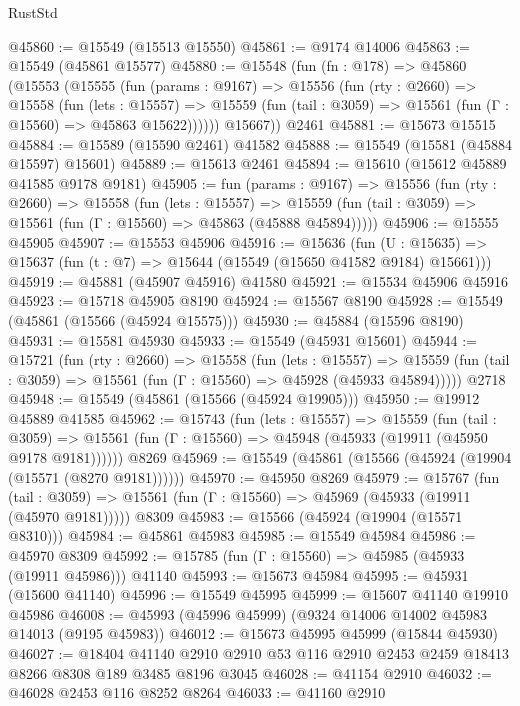 \begin{lexlean}{RustStd}
\begin{coremodule}
@45860 := @15549 (@15513 @15550)
@45861 := @9174 @14006
@45863 := @15549 (@45861 @15577)
@45880 := @15548
    (fun (fn : @178) =>
    @45860
      (@15553
        (@15555
          (fun (params : @9167) =>
          @15556
            (fun (rty : @2660) =>
            @15558
              (fun (lets : @15557) =>
              @15559 (fun (tail : @3059) => @15561 (fun (Γ : @15560) => @45863 @15622))))))
        @15667))
    @2461
@45881 := @15673 @15515
@45884 := @15589 (@15590 @2461) @41582
@45888 := @15549 (@15581 (@45884 @15597) @15601)
@45889 := @15613 @2461
@45894 := @15610 (@15612 @45889 @41585 @9178 @9181)
@45905 := fun (params : @9167) =>
  @15556
    (fun (rty : @2660) =>
    @15558
      (fun (lets : @15557) =>
      @15559 (fun (tail : @3059) => @15561 (fun (Γ : @15560) => @45863 (@45888 @45894)))))
@45906 := @15555 @45905
@45907 := @15553 @45906
@45916 := @15636
    (fun (U : @15635) => @15637 (fun (t : @7) => @15644 (@15549 (@15650 @41582 @9184) @15661)))
@45919 := @45881 (@45907 @45916) @41580
@45921 := @15534 @45906 @45916
@45923 := @15718 @45905 @8190
@45924 := @15567 @8190
@45928 := @15549 (@45861 (@15566 (@45924 @15575)))
@45930 := @45884 (@15596 @8190)
@45931 := @15581 @45930
@45933 := @15549 (@45931 @15601)
@45944 := @15721
    (fun (rty : @2660) =>
    @15558
      (fun (lets : @15557) =>
      @15559 (fun (tail : @3059) => @15561 (fun (Γ : @15560) => @45928 (@45933 @45894)))))
    @2718
@45948 := @15549 (@45861 (@15566 (@45924 @19905)))
@45950 := @19912 @45889 @41585
@45962 := @15743
    (fun (lets : @15557) =>
    @15559
      (fun (tail : @3059) =>
      @15561 (fun (Γ : @15560) => @45948 (@45933 (@19911 (@45950 @9178 @9181))))))
    @8269
@45969 := @15549 (@45861 (@15566 (@45924 (@19904 (@15571 (@8270 @9181))))))
@45970 := @45950 @8269
@45979 := @15767
    (fun (tail : @3059) => @15561 (fun (Γ : @15560) => @45969 (@45933 (@19911 (@45970 @9181)))))
    @8309
@45983 := @15566 (@45924 (@19904 (@15571 @8310)))
@45984 := @45861 @45983
@45985 := @15549 @45984
@45986 := @45970 @8309
@45992 := @15785 (fun (Γ : @15560) => @45985 (@45933 (@19911 @45986))) @41140
@45993 := @15673 @45984
@45995 := @45931 (@15600 @41140)
@45996 := @15549 @45995
@45999 := @15607 @41140 @19910 @45986
@46008 := @45993 (@45996 @45999) (@9324 @14006 @14002 @45983 @14013 (@9195 @45983))
@46012 := @15673 @45995 @45999 (@15844 @45930)
@46027 := @18404
    @41140
    @2910
    @2910
    @53
    @116
    @2910
    @2453
    @2459
    @18413
    @8266
    @8308
    @189
    @3485
    @8196
    @3045
@46028 := @41154 @2910
@46032 := @46028 @2453 @116 @8252 @8264
@46033 := @41160 @2910

\end{coremodule}
\end{lexlean}
